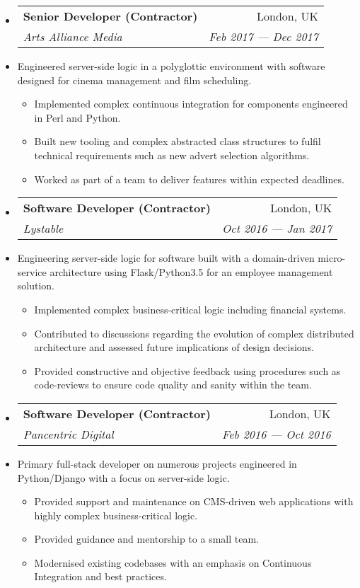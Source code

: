 \documentclass[letterpaper,11pt]{article}
\makeatletter
\newcommand{\ressubheading}[4]
    {\begin{tabular*}{180mm}{l@{\extracolsep{\fill}}r}
        \textbf{#1} & #2 \\
        \textit{#3} & \textit{#4} \\
    \end{tabular*}\vspace{-6pt}}
\newcommand{\resdescription}[1]{#1 \vspace{-0mm}}
\newcommand{\resitem}[1]{\item #1 \vspace{-2pt}}
\makeatother
\begin{document}
\begin{itemize}
        \item[]
            \ressubheading{Senior Developer (Contractor)}{London, UK}{Arts Alliance Media}{Feb 2017 --- Dec 2017}
        \item[]
            \resdescription{Engineered server-side logic in a polyglottic environment with software designed for cinema management and film scheduling.}
            \begin{itemize}
                    \resitem{Implemented complex continuous integration for components engineered in Perl and Python.}
                    \resitem{Built new tooling and complex abstracted class structures to fulfil technical requirements such as new advert selection algorithms.}
                    \resitem{Worked as part of a team to deliver features within expected deadlines.}
            \end{itemize}
        \item[]
            \ressubheading{Software Developer (Contractor)}{London, UK}{Lystable}{Oct 2016 --- Jan 2017}
        \item[]
            \resdescription{Engineering server-side logic for software built with a domain-driven micro-service architecture using Flask/Python3.5 for an employee management solution.}
            \begin{itemize}
                    \resitem{Implemented complex business-critical logic including financial systems.}
                    \resitem{Contributed to discussions regarding the evolution of complex distributed architecture and assessed future implications of design decisions.}
                    \resitem{Provided constructive and objective feedback using procedures such as code-reviews to ensure code quality and sanity within the team.}
            \end{itemize}
        \item[]
            \ressubheading{Software Developer (Contractor)}{London, UK}{Pancentric Digital}{Feb 2016 --- Oct 2016}
        \item[]
            \resdescription{Primary full-stack developer on numerous projects engineered in Python/Django with a focus on server-side logic.}
            \begin{itemize}
                    \resitem{Provided support and maintenance on CMS-driven web applications with highly complex business-critical logic.}
                    \resitem{Provided guidance and mentorship to a small team.}
                    \resitem{Modernised existing codebases with an emphasis on Continuous Integration and best practices.}

\end{itemize}
\end{itemize}
\end{document}
